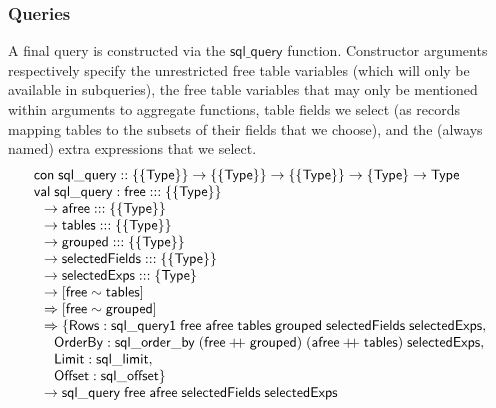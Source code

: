 \documentclass{article}
\newcommand{\mt}[1]{\mathsf{#1}}
\newcommand{\rc}{+ \hspace{-.075in} + \;}
\begin{document}
\subsubsection{Queries}

A final query is constructed via the $\mt{sql\_query}$ function.  Constructor arguments respectively specify the unrestricted free table variables (which will only be available in subqueries), the free table variables that may only be mentioned within arguments to aggregate functions, table fields we select (as records mapping tables to the subsets of their fields that we choose), and the (always named) extra expressions that we select.
$$\begin{array}{l}
  \mt{con} \; \mt{sql\_query} :: \{\{\mt{Type}\}\} \to \{\{\mt{Type}\}\} \to \{\{\mt{Type}\}\} \to \{\mt{Type}\} \to \mt{Type} \\
  \mt{val} \; \mt{sql\_query} : \mt{free} ::: \{\{\mt{Type}\}\} \\
  \hspace{.1in} \to \mt{afree} ::: \{\{\mt{Type}\}\} \\
  \hspace{.1in} \to \mt{tables} ::: \{\{\mt{Type}\}\} \\
  \hspace{.1in} \to \mt{grouped} ::: \{\{\mt{Type}\}\} \\
  \hspace{.1in} \to \mt{selectedFields} ::: \{\{\mt{Type}\}\} \\
  \hspace{.1in} \to \mt{selectedExps} ::: \{\mt{Type}\} \\
  \hspace{.1in} \to [\mt{free} \sim \mt{tables}] \\
  \hspace{.1in} \Rightarrow [\mt{free} \sim \mt{grouped}] \\
  \hspace{.1in} \Rightarrow \{\mt{Rows} : \mt{sql\_query1} \; \mt{free} \; \mt{afree} \; \mt{tables} \; \mt{grouped} \; \mt{selectedFields} \; \mt{selectedExps}, \\
  \hspace{.2in} \mt{OrderBy} : \mt{sql\_order\_by} \; (\mt{free} \rc \mt{grouped}) \; (\mt{afree} \rc \mt{tables}) \; \mt{selectedExps}, \\
  \hspace{.2in} \mt{Limit} : \mt{sql\_limit}, \\
  \hspace{.2in} \mt{Offset} : \mt{sql\_offset}\} \\
  \hspace{.1in} \to \mt{sql\_query} \; \mt{free} \; \mt{afree} \; \mt{selectedFields} \; \mt{selectedExps}
\end{array}$$
\end{document}
